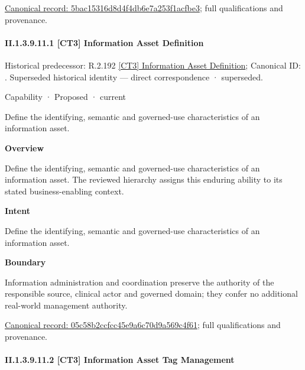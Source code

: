 {\footnotesize \href{../../../../continuum/strategy/capability/5bac15316d8d4f4db6e7a253f1acfbe3.md}{Canonical record: 5bac15316d8d4f4db6e7a253f1acfbe3}; full qualifications and provenance.}\par
\paragraph*{II.1.3.9.11.1 [CT3] Information Asset Definition}
\label{navigation:II.1.3.9.11.1}

{\small Historical predecessor: R.2.192 \hyperref[element:166a22463d2c4534bda7ae31273398b6]{[CT3] Information Asset Definition}; Canonical ID: \texttt{}. Superseded historical identity — direct correspondence · superseded.}\par
\label{element:05c58b2ccfcc45e9a6c70d9a569c4f61}
{\small Capability · Proposed · current}\par

Define the identifying, semantic and governed-use characteristics of an information asset.



\textbf{Overview}



Define the identifying, semantic and governed-use characteristics of an information asset. The reviewed hierarchy assigns this enduring ability to its stated business-enabling context.



\textbf{Intent}



Define the identifying, semantic and governed-use characteristics of an information asset.



\textbf{Boundary}



Information administration and coordination preserve the authority of the responsible source, clinical actor and governed domain; they confer no additional real-world management authority.


{\footnotesize \href{../../../../continuum/strategy/capability/05c58b2ccfcc45e9a6c70d9a569c4f61.md}{Canonical record: 05c58b2ccfcc45e9a6c70d9a569c4f61}; full qualifications and provenance.}\par
\paragraph*{II.1.3.9.11.2 [CT3] Information Asset Tag Management}
\label{navigation:II.1.3.9.11.2}

